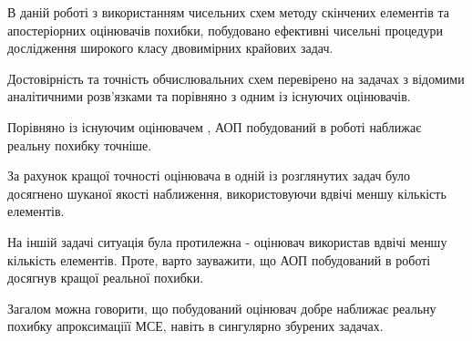 

В даній роботі з використанням чисельних схем методу скінчених елементів та апостеріорних оцінювачів похибки, побудовано ефективні чисельні процедури дослідження широкого класу двовимірних крайових задач.

Достовірність та точність обчислювальних схем перевірено на задачах з відомими аналітичними розв’язками та порівняно з одним із існуючих оцінювачів.

Порівняно із існуючим оцінювачем \cite{OstShynAee11}, АОП побудований в роботі наближає реальну похибку точніше.

За рахунок кращої точності оцінювача в одній із розглянутих задач було досягнено шуканої якості наближення, використовуючи вдвічі меншу кількість елементів.

На іншій задачі ситуація була протилежна - оцінювач \cite{OstShynAee11} використав вдвічі меншу кількість елементів. Проте, варто зауважити, що АОП побудований в роботі досягнув кращої реальної похибки.

Загалом можна говорити, що побудований оцінювач добре наближає реальну похибку апроксимаціїї МСЕ, навіть в сингулярно збурених задачах.

